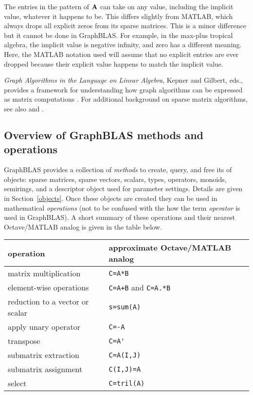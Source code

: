 \documentclass[12pt]{article}
\begin{document}
The entries in the pattern of ${\bf A}$ can take on any value, including the
implicit value, whatever it happens to be.  This differs slightly from MATLAB,
which always drops all explicit zeros from its sparse matrices.  This is a
minor difference but it cannot be done in GraphBLAS.  For example, in the
max-plus tropical algebra, the implicit value is negative infinity, and zero
has a different meaning.  Here, the MATLAB notation used will assume that no
explicit entries are ever dropped because their explicit value happens to match
the implicit value.

{\em Graph Algorithms in the Language on Linear Algebra}, Kepner and Gilbert,
eds., provides a framework for understanding how graph algorithms can be
expressed as matrix computations \cite{KepnerGilbert2011}.  For additional
background on sparse matrix algorithms, see also \cite{Davis06book} and
\cite{DavisRajamanickamSidLakhdar16}.

\subsection{Overview of GraphBLAS methods and operations} %
\label{overview}

GraphBLAS provides a collection of {\em methods} to create, query, and free its
of objects: sparse matrices, sparse vectors, scalars, types, operators,
monoids, semirings, and a descriptor object used for parameter settings.
Details are given in Section~\ref{objects}.  Once these objects are created
they can be used in mathematical {\em operations} (not to be confused with the
how the term {\em operator} is used in GraphBLAS).  A short summary of these
operations and their nearest Octave/MATLAB analog is given in the table below.

\begin{tabular}{ll}
operation                           & approximate Octave/MATLAB analog \\
\hline
matrix multiplication               & \verb'C=A*B' \\
element-wise operations             & \verb'C=A+B' and \verb'C=A.*B' \\
reduction to a vector or scalar     & \verb's=sum(A)' \\
apply unary operator                & \verb'C=-A' \\
transpose                           & \verb"C=A'" \\
submatrix extraction                & \verb'C=A(I,J)' \\
submatrix assignment                & \verb'C(I,J)=A' \\
select                              & \verb'C=tril(A)' \\
\hline
\end{tabular}
\vspace{0.1in}
\end{document}
